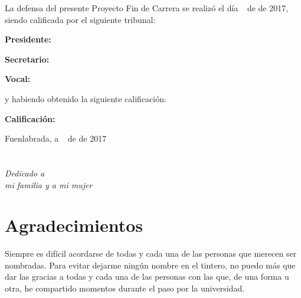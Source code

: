 \documentclass[a4paper, 12pt]{book}
\begin{document}
\vspace{1cm}
La defensa del presente Proyecto Fin de Carrera se realizó el día \qquad$\;\,$ de \qquad\qquad\qquad\qquad \newline de 2017, siendo calificada por el siguiente tribunal:


\vspace{0.5cm}
\textbf{Presidente:}

\vspace{1.2cm}
\textbf{Secretario:}

\vspace{1.2cm}
\textbf{Vocal:}


\vspace{1.2cm}
y habiendo obtenido la siguiente calificación:

\vspace{1cm}
\textbf{Calificación:}


\vspace{1cm}
\begin{flushright}
Fuenlabrada, a \qquad$\;\,$ de \qquad\qquad\qquad\qquad de 2017
\end{flushright}


\chapter*{}
\begin{flushright}
\textit{Dedicado a \\
mi familia y a mi mujer}
\end{flushright}


\chapter*{Agradecimientos}
Siempre es difícil acordarse de todas y cada una de las personas que merecen ser nombradas. Para evitar dejarme ningún nombre en el tintero, no puedo más que dar las gracias a todas y cada una de las personas con las que, de una forma u otra, he compartido momentos durante el paso por la universidad.
\end{document}
